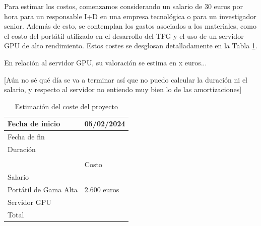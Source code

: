 Para estimar los costos, comenzamos considerando un salario de 30 euros por hora para un responsable I+D en una empresa tecnológica o para un investigador senior. Además de esto, se contemplan los gastos asociados a los materiales, como el costo del portátil utilizado en el desarrollo del TFG y el uso de un servidor GPU de alto rendimiento. Estos costes se desglosan detalladamente en la Tabla \ref{tab:coste-proyecto}. 

En relación al servidor GPU, su valoración se estima en x euros...

[Aún no sé qué día se va a terminar así que no puedo calcular la duración ni el salario, y respecto al servidor no entiendo muy bien lo de las amortizaciones]

\begin{table}[h]
	\centering
	\begin{tabular}{ll}
	\hline
	\multicolumn{1}{|l|}{\cellcolor[HTML]{FFCB2F}Fecha de inicio} & \multicolumn{1}{l|}{05/02/2024} \\ \hline
	\multicolumn{1}{|l|}{\cellcolor[HTML]{FFCB2F}Fecha de fin} & \multicolumn{1}{l|}{} \\ \hline
	\multicolumn{1}{|l|}{\cellcolor[HTML]{FFCB2F}Duración} & \multicolumn{1}{l|}{} \\ \hline
	 &  \\ \hline
	\rowcolor[HTML]{FFCB2F} 
	\multicolumn{1}{|l|}{\cellcolor[HTML]{FFCB2F}Item} & \multicolumn{1}{l|}{\cellcolor[HTML]{FFCB2F}Costo} \\ \hline
	\multicolumn{1}{|l|}{Salario} & \multicolumn{1}{l|}{} \\ \hline
	\multicolumn{1}{|l|}{Portátil de Gama Alta} & \multicolumn{1}{l|}{2.600 euros} \\ \hline
	\multicolumn{1}{|l|}{Servidor GPU} & \multicolumn{1}{l|}{} \\ \hline
	\multicolumn{1}{|l|}{\cellcolor[HTML]{FFCB2F}Total} & \multicolumn{1}{l|}{} \\ \hline
	\end{tabular}
	\caption{Estimación del coste del proyecto}
	\label{tab:coste-proyecto}
\end{table}